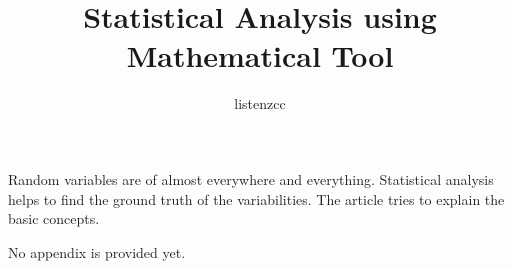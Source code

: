 \documentclass[a4paper]{article}
\title{Statistical Analysis using Mathematical Tool}
\author{listenzcc}
\begin{document}
\maketitle

\abstract
Random variables are of almost everywhere and everything.
Statistical analysis helps to find the ground truth of the variabilities.
The article tries to explain the basic concepts.

\tableofcontents




\appendix
No appendix is provided yet.
\end{document}

